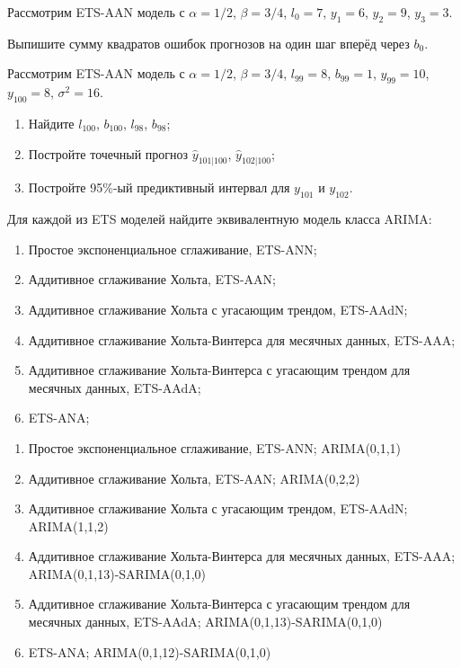 \begin{problem}
  Рассмотрим ETS-AAN модель с $\alpha = 1/2$, $\beta=3/4$, $l_{0}=7$, $y_1=6$, $y_2=9$, $y_3=3$.  

  Выпишите сумму квадратов ошибок прогнозов на один шаг вперёд через $b_0$.
\begin{sol}
\end{sol}
\end{problem}



\begin{problem}
  Рассмотрим ETS-AAN модель с $\alpha = 1/2$, $\beta=3/4$, $l_{99}=8$, $b_{99}=1$, $y_{99}=10$, $y_{100}=8$, $\sigma^2=16$.
  \begin{enumerate}
    \item Найдите $l_{100}$, $b_{100}$, $l_{98}$, $b_{98}$;
    \item Постройте точечный прогноз $\hat y_{101|100}$, $\hat y_{102|100}$;
    \item Постройте 95\%-ый предиктивный интервал для $y_{101}$ и $y_{102}$.
  \end{enumerate}
\begin{sol}
\end{sol}
\end{problem}


\begin{problem}
Для каждой из ETS моделей найдите эквивалентную модель класса ARIMA:
	\begin{enumerate}
		\item Простое экспоненциальное сглаживание, ETS-ANN;
		\item Аддитивное сглаживание Хольта, ETS-AAN;
		\item Аддитивное сглаживание Хольта с угасающим трендом, ETS-AAdN;
		\item Аддитивное сглаживание Хольта-Винтерса для месячных данных, ETS-AAA;
		\item Аддитивное сглаживание Хольта-Винтерса с угасающим трендом для месячных данных, ETS-AAdA;
		\item ETS-ANA;
	\end{enumerate}
\begin{sol}
	\begin{enumerate}
		\item Простое экспоненциальное сглаживание, ETS-ANN; ARIMA(0,1,1)
		\item Аддитивное сглаживание Хольта, ETS-AAN; ARIMA(0,2,2)
		\item Аддитивное сглаживание Хольта с угасающим трендом, ETS-AAdN; ARIMA(1,1,2)
		\item Аддитивное сглаживание Хольта-Винтерса для месячных данных, ETS-AAA; ARIMA(0,1,13)-SARIMA(0,1,0)
		\item Аддитивное сглаживание Хольта-Винтерса с угасающим трендом для месячных данных, ETS-AAdA; ARIMA(0,1,13)-SARIMA(0,1,0)
		\item ETS-ANA; ARIMA(0,1,12)-SARIMA(0,1,0)
	\end{enumerate}
\end{sol}
\end{problem}


